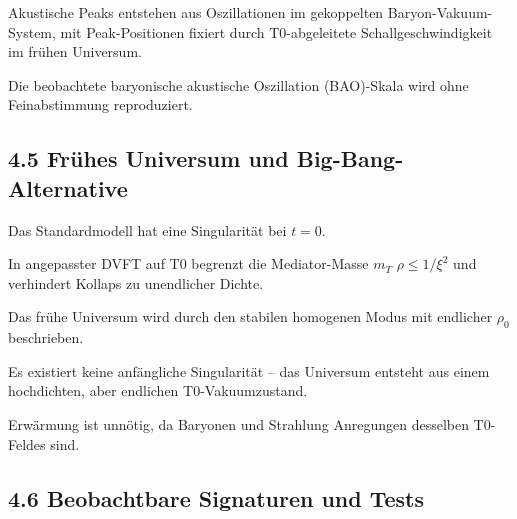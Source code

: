 	Akustische Peaks entstehen aus Oszillationen im gekoppelten Baryon-Vakuum-System, mit Peak-Positionen fixiert durch T0-abgeleitete Schallgeschwindigkeit im frühen Universum.
	
	Die beobachtete baryonische akustische Oszillation (BAO)-Skala wird ohne Feinabstimmung reproduziert.
	
	\subsection{4.5 Frühes Universum und Big-Bang-Alternative}
	
	Das Standardmodell hat eine Singularität bei $t=0$.
	
	In angepasster DVFT auf T0 begrenzt die Mediator-Masse $m_T$ $\rho \leq 1/\xi^2$ und verhindert Kollaps zu unendlicher Dichte.
	
	Das frühe Universum wird durch den stabilen homogenen Modus mit endlicher $\rho_0$ beschrieben.
	
	Es existiert keine anfängliche Singularität – das Universum entsteht aus einem hochdichten, aber endlichen T0-Vakuumzustand.
	
	Erwärmung ist unnötig, da Baryonen und Strahlung Anregungen desselben T0-Feldes sind.
	
	\subsection{4.6 Beobachtbare Signaturen und Tests}
	
	\begin{table}[htbp]
		\centering
		\caption{Kosmologische Vorhersagen-Vergleich}
		\label{tab:kosmo}
	\end{table}
	
